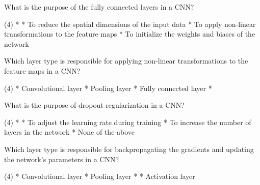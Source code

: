 \documentclass[10pt]{extarticle}
\begin{document}
\begin{exercise}
    What is the purpose of the fully connected layers in a CNN?
    \begin{choice} (4)
        * 
        * To reduce the spatial dimensions of the input data
        * To apply non-linear transformations to the feature maps
        * To initialize the weights and biases of the network
    \end{choice}
\end{exercise}
\begin{solution}
\end{solution}


\begin{exercise}
    Which layer type is responsible for applying non-linear transformations to the feature maps in a CNN?
    \begin{choice} (4)
        * Convolutional layer
        * Pooling layer
        * Fully connected layer
        * 
    \end{choice}
\end{exercise}
\begin{solution}
\end{solution}

\begin{exercise}
    What is the purpose of dropout regularization in a CNN?
    \begin{choice} (4)
        * 
        * To adjust the learning rate during training
        * To increase the number of layers in the network
        * None of the above
    \end{choice}
\end{exercise}
\begin{solution}
\end{solution}

\begin{exercise}
    Which layer type is responsible for backpropagating the gradients and updating the network's parameters in a CNN?
    \begin{choice} (4)
        * Convolutional layer
        * Pooling layer
        * 
        * Activation layer
    \end{choice}
\end{exercise}
\begin{solution}
\end{solution}
\end{document}
